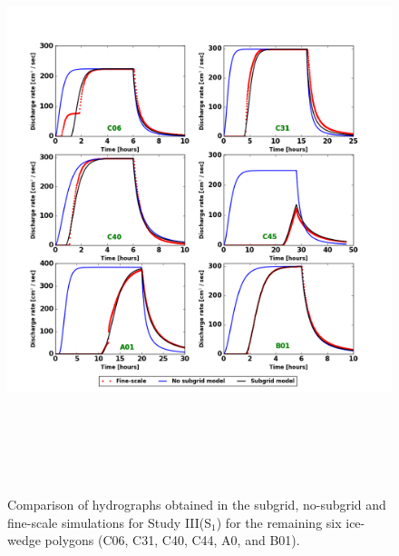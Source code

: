 \begin{figure}
\centering
\includegraphics[width=13.2cm, height=17cm]{./figures/new-model/all-polygons-hydrograph.png}
\caption{Comparison of hydrographs obtained in the subgrid, no-subgrid and fine-scale simulations for Study III(S$_1$) for the remaining six ice-wedge polygons (C06, C31, C40, C44, A0, and B01).}
\label{all-polygons-hydrographs}
\end{figure}

